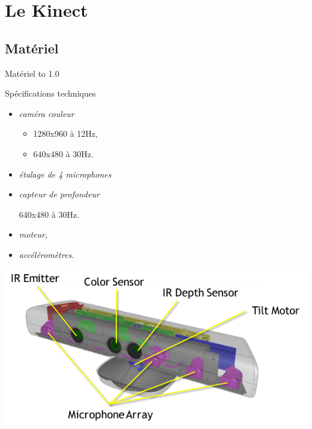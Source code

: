 \section{Le Kinect}

\begin{frame}
\end{frame}

\subsection{Matériel}
\begin{frame}{Matériel}
\vbox to 1.0\textheight
{
\begin{block}{Spécifications techniques~\cite{kinect_msdn}\cite{wiki_kinect}}
  \begin{minipage}[t]{0.49\linewidth}
    \begin{itemize}
    \item \emph{caméra couleur}
    \begin{itemize}
    \item 1280x960 à 12Hz,
    \item 640x480 à 30Hz.
    \end{itemize}%
    \item \emph{étalage de 4 microphones}
    \end{itemize}
  \end{minipage} 
  \begin{minipage}[t]{0.49\linewidth}
    \begin{itemize}
    \item \emph{capteur de profondeur}
    \begin{itemize}
    640x480 à 30Hz.
    \end{itemize}%
    \item \emph{moteur},
    \item \emph{accéléromètres}.
    \end{itemize}
  \end{minipage}
\end{block}
  \begin{center}
    \includegraphics[height=0.4\textheight]{../images/kinect_specs}

\end{center}}
\end{frame}
